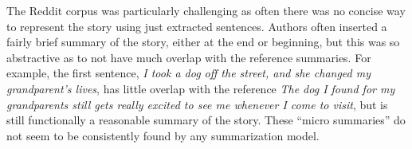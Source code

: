 The Reddit corpus was particularly challenging as often there was no concise
way to represent the story using just extracted sentences. Authors often inserted a 
fairly brief summary of the story, either at the end or beginning, but
this was so abstractive as to not have much overlap with the reference
summaries. For example, the first sentence, \textit{I took a dog off the street, and she changed my grandparent's lives}, has little overlap with the reference
\textit{The dog I found for my grandparents still gets really excited to see
me whenever I come to visit}, but is still functionally a reasonable 
summary of the story. These ``micro summaries'' do not seem to be 
consistently found by any summarization model. 



